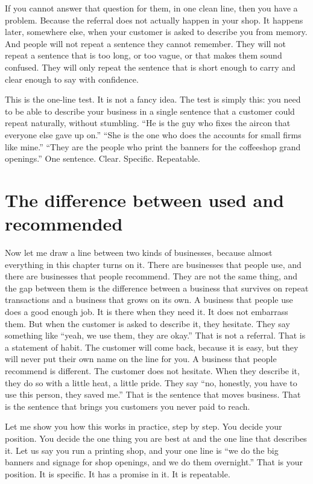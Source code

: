 \documentclass[10pt,twoside,openany]{memoir}
\newcommand{\needspacehead}{\needspace{4\baselineskip}}
\let\oldsection\section
\renewcommand{\section}{\needspacehead\oldsection}
\begin{document}
{If you cannot answer that question for them, in one clean line, then you
have a problem. Because the referral does not actually happen in your
shop. It happens later, somewhere else, when your customer is asked to
describe you from memory. And people will not repeat a sentence they
cannot remember. They will not repeat a sentence that is too long, or
too vague, or that makes them sound confused. They will only repeat the
sentence that is short enough to carry and clear enough to say with
confidence.

This is the one-line test. It is not a fancy idea. The test is simply
this: you need to be able to describe your business in a single sentence
that a customer could repeat naturally, without stumbling. ``He is the
guy who fixes the aircon that everyone else gave up on.'' ``She is the
one who does the accounts for small firms like mine.'' ``They are the
people who print the banners for the coffeeshop grand openings.'' One
sentence. Clear. Specific. Repeatable.

\section{The difference between used and
recommended}\label{the-difference-between-used-and-recommended}

Now let me draw a line between two kinds of businesses, because almost
everything in this chapter turns on it. There are businesses that people
use, and there are businesses that people recommend. They are not the
same thing, and the gap between them is the difference between a
business that survives on repeat transactions and a business that grows
on its own. A business that people use does a good enough job. It is
there when they need it. It does not embarrass them. But when the
customer is asked to describe it, they hesitate. They say something like
``yeah, we use them, they are okay.'' That is not a referral. That is a
statement of habit. The customer will come back, because it is easy, but
they will never put their own name on the line for you. A business that
people recommend is different. The customer does not hesitate. When they
describe it, they do so with a little heat, a little pride. They say
``no, honestly, you have to use this person, they saved me.'' That is
the sentence that moves business. That is the sentence that brings you
customers you never paid to reach.

Let me show you how this works in practice, step by step. You decide
your position. You decide the one thing you are best at and the one line
that describes it. Let us say you run a printing shop, and your one line
is ``we do the big banners and signage for shop openings, and we do them
overnight.'' That is your position. It is specific. It has a promise in
it. It is repeatable.

}
\end{document}
